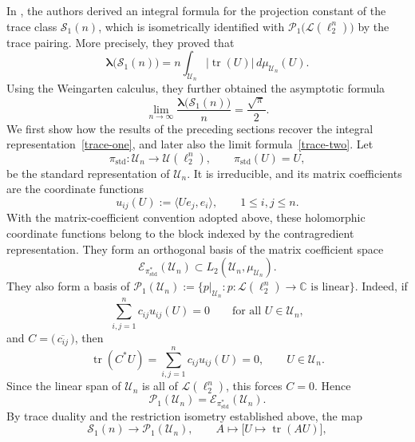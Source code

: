 \documentclass[11pt,showkeys]{amsart}
\begin{document}
In \cite[Theorem~2.1]{defant2025projection}, the authors derived an
integral formula for the projection constant of the trace class
\(\mathcal S_1(n)\), which is isometrically identified with
\(\mathcal P_1\bigl(\mathcal L(\ell_2^n)\bigr)\) by the trace pairing.
More precisely, they proved that
\begin{equation}\label{trace-one}
        \boldsymbol{\lambda}\bigl(\mathcal S_1(n)\bigr)
        =
        n
        \int_{\mathcal U_n}
        \bigl|\operatorname{tr}(U)\bigr|
        \,d\mu_{\mathcal U_n}(U).
\end{equation}
Using the Weingarten calculus, they further obtained the asymptotic formula
\begin{equation}\label{trace-two}
        \lim_{n\to\infty}
        \frac{\boldsymbol\lambda\bigl(\mathcal S_1(n)\bigr)}{n}
        =
        \frac{\sqrt{\pi}}{2}.
\end{equation}
We first show how the results of the preceding sections recover the
integral representation~\eqref{trace-one}, and later also the limit formula~\eqref{trace-two}.
Let
\[
        \pi_{\mathrm{std}}:\mathcal U_n\longrightarrow
        \mathcal U(\ell_2^n),
        \qquad
        \pi_{\mathrm{std}}(U)=U,
\]
be the standard representation of \(\mathcal U_n\). It is irreducible,
and its matrix coefficients are the coordinate functions
\[
        u_{ij}(U)
        :=
        \langle Ue_j,e_i\rangle,
        \qquad 1\le i,j\le n.
\]
With the matrix-coefficient convention adopted above, these holomorphic
coordinate functions belong to the block indexed by the contragredient
representation. They form an orthogonal basis of the matrix coefficient space
\[
        \mathcal E_{\pi_{\mathrm{std}}^*}(\mathcal U_n)
        \subset L_2(\mathcal U_n,\mu_{\mathcal U_n}).
\]
They also form a basis of
\(
        \mathcal P_1(\mathcal U_n)
        :=
        \{p|_{\mathcal U_n}:p: \mathcal L(\ell_2^n)\to\mathbb C
        \text{ is linear}\}.
\)
Indeed, if
\[
        \sum_{i,j=1}^n c_{ij}u_{ij}(U)=0
        \qquad
        \text{for all }U\in\mathcal U_n,
\]
and $C=\big(\,\overline{c_{ij}}\,\big)$, then
\[
        \operatorname{tr}(C^*U)
        =
        \sum_{i,j=1}^n c_{ij}u_{ij}(U)
        =
        0,
        \qquad U\in\mathcal U_n.
\]
Since the linear span of \(\mathcal U_n\) is all of
\(\mathcal L(\ell_2^n)\), this forces \(C=0\). Hence
\[
        \mathcal P_1(\mathcal U_n)
        =
        \mathcal E_{\pi_{\mathrm{std}}^*}(\mathcal U_n).
\]
By trace duality and the restriction isometry established above, the map
\[
        \mathcal S_1(n)
        \longrightarrow
        \mathcal P_1(\mathcal U_n),
        \qquad
        A\longmapsto
        \big[U\mapsto \operatorname{tr}(AU)\big],
\]
\end{document}

